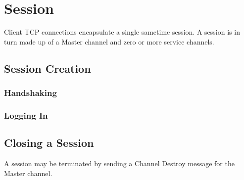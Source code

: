 

\chapter{Session}

\par{} Client TCP connections encapsulate a single sametime session. A
session is in turn made up of a Master channel and zero or more
service channels.


\section{Session Creation}

\subsection{Handshaking}

\subsection{Logging In}


\section{Closing a Session}

\par{} A session may be terminated by sending a Channel Destroy
message for the Master channel.


